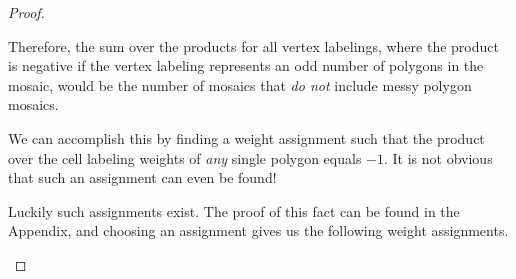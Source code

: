 \documentclass[12pt]{article}
\theoremstyle{plain}
\theoremstyle{definition}
\theoremstyle{remark}
\theoremstyle{definition}
\newcommand{\cell}[4]{ \draw[thick] ( #1 , #2 ) rectangle ( #3 , #4 );}
\newcommand{\cellopen}[4]{ \draw[thick] ( #1 , #2 ) rectangle ( #3 , #4 ); \node[shape=circle,draw=red,fill=red, inner sep=0pt,minimum size=3pt] (A) at ( #1 * 0.5 + #3 * 0.5 , #2 * 0.5 + #4 * 0.5 ){};}
\newcommand{\cellA}[4]{\draw[red, thick, densely dotted] ( #1 + 0.5 , #2 ) arc(0:90:{0.5}); \draw[thick] ( #1 , #2 ) rectangle ( #3 , #4 );}
\newcommand{\cellB}[4]{\draw[red, thick, densely dotted] ( #1 + 1 , #2 + 0.5 ) arc(90:180:{0.5}); \draw[thick] ( #1 , #2 ) rectangle ( #3 , #4 );}
\newcommand{\cellC}[4]{\draw[red, thick, densely dotted] ( #1 + 0.5, #2 + 1 ) arc(180:270:{0.5}); \draw[thick] ( #1 , #2 ) rectangle ( #3 , #4 );}
\newcommand{\cellD}[4]{\draw[red, thick, densely dotted] ( #1 , #2 + 0.5 ) arc(-90:0:{0.5}); \draw[thick] ( #1 , #2 ) rectangle ( #3 , #4 );}
\begin{document}
\begin{proof}
\begin{center}
\end{center}

Therefore, the sum over the products for all vertex labelings, where the product is negative if the vertex labeling represents an odd number of polygons in the mosaic, would be the number of mosaics that \textit{do not} include messy polygon mosaics.

We can accomplish this by finding a weight assignment such that the product over the cell labeling weights of \textit{any} single polygon equals $-1$. It is not obvious that such an assignment can even be found! 

Luckily such assignments exist. The proof of this fact can be found in the Appendix, and choosing an assignment gives us the following weight assignments.

\begin{center}
\end{center}
\end{proof}
\end{document}
